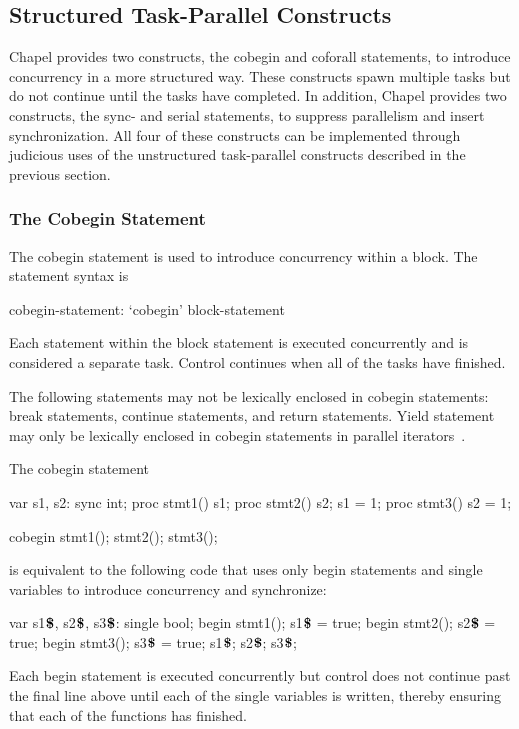 \subsection{Structured Task-Parallel Constructs}
\label{structured_task_parallelism}

Chapel provides two constructs, the cobegin and coforall statements,
to introduce concurrency in a more structured way.  These constructs
spawn multiple tasks but do not continue until the tasks have
completed.  In addition, Chapel provides two constructs, the sync- and
serial statements, to suppress parallelism and insert synchronization.
All four of these constructs can be implemented through judicious uses
of the unstructured task-parallel constructs described in the previous
section.

\subsubsection{The Cobegin Statement}
\label{Cobegin}

The cobegin statement is used to introduce concurrency within a
block.  The  statement syntax is
\begin{syntax}
cobegin-statement:
  `cobegin' block-statement
\end{syntax}
Each statement within the block statement is executed concurrently and
is considered a separate task.  Control continues when all of the
tasks have finished.

The following statements may not be lexically enclosed in
cobegin statements: break statements, continue statements, and
return statements.  Yield statement may only be lexically enclosed in
cobegin statements in parallel iterators~.

\begin{example}
The cobegin statement
\begin{chapelpre}
var s1, s2: sync int;
proc stmt1() { s1; }
proc stmt2() { s2; s1 = 1; }
proc stmt3() { s2 = 1; }
\end{chapelpre}
\begin{chapel}
cobegin {
  stmt1();
  stmt2();
  stmt3();
}
\end{chapel}
is equivalent to the following code that uses only begin statements
and single variables to introduce concurrency and synchronize:
\begin{chapel}
var s1$\mbox{{\bf \$}}$, s2$\mbox{{\bf \$}}$, s3$\mbox{{\bf \$}}$: single bool;
begin { stmt1(); s1$\mbox{{\bf \$}}$ = true; }
begin { stmt2(); s2$\mbox{{\bf \$}}$ = true; }
begin { stmt3(); s3$\mbox{{\bf \$}}$ = true; }
s1$\mbox{{\bf \$}}$; s2$\mbox{{\bf \$}}$; s3$\mbox{{\bf \$}}$;
\end{chapel}
\begin{chapeloutput}
\end{chapeloutput}
Each begin statement is executed concurrently but control does not
continue past the final line above until each of the single variables
is written, thereby ensuring that each of the functions has finished.
\end{example}

